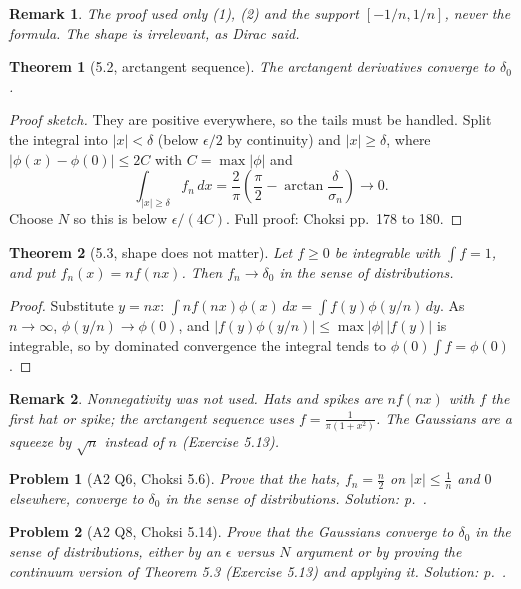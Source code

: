\documentclass{article}
\newtheorem{theorem}{Theorem}
\newtheorem{problem}{Problem}
\newtheorem{remark}{Remark}
\begin{document}
\begin{remark}
    The proof used only (1), (2) and the support $[-1/n,1/n]$, never the formula. The shape is irrelevant, as Dirac said.
\end{remark}
\begin{theorem}[5.2, arctangent sequence]
    The arctangent derivatives converge to $\delta_0$.
\end{theorem}
\begin{proof}[Proof sketch]
    They are positive everywhere, so the tails must be handled. Split the integral into $|x| < \delta$ (below $\epsilon/2$ by continuity) and $|x| \geq \delta$, where $|\phi(x) - \phi(0)| \leq 2C$ with $C = \max|\phi|$ and
    \begin{equation}
        \int_{|x|\geq\delta} f_n\,dx = \frac{2}{\pi}\left(\frac{\pi}{2} - \arctan\frac{\delta}{\sigma_n}\right) \to 0.
    \end{equation}
    Choose $N$ so this is below $\epsilon/(4C)$. Full proof: Choksi pp.~178 to 180.
\end{proof}
\begin{theorem}[5.3, shape does not matter]
    Let $f \geq 0$ be integrable with $\int f = 1$, and put $f_n(x) = n f(nx)$. Then $f_n \to \delta_0$ in the sense of distributions.
\end{theorem}
\begin{proof}
    Substitute $y = nx$: $\int n f(nx)\phi(x)\,dx = \int f(y)\phi(y/n)\,dy$. As $n \to \infty$, $\phi(y/n) \to \phi(0)$, and $|f(y)\phi(y/n)| \leq \max|\phi|\,|f(y)|$ is integrable, so by dominated convergence the integral tends to $\phi(0)\int f = \phi(0)$.
\end{proof}
\begin{remark}
    Nonnegativity was not used. Hats and spikes are $nf(nx)$ with $f$ the first hat or spike; the arctangent sequence uses $f = \frac{1}{\pi(1+x^2)}$. The Gaussians are a squeeze by $\sqrt{n}$ instead of $n$ (Exercise 5.13).
\end{remark}

\begin{problem}[A2 Q6, Choksi 5.6]\label{prob:a2-56}
    Prove that the hats, $f_n = \frac n2$ on $|x| \leq \frac1n$ and $0$ elsewhere, converge to $\delta_0$ in the sense of distributions.
    \hfill \emph{Solution: p.~\pageref{sol:a2-56}.}
\end{problem}
\begin{problem}[A2 Q8, Choksi 5.14]\label{prob:a2-514}
    Prove that the Gaussians converge to $\delta_0$ in the sense of distributions, either by an $\epsilon$ versus $N$ argument or by proving the continuum version of Theorem 5.3 (Exercise 5.13) and applying it.
    \hfill \emph{Solution: p.~\pageref{sol:a2-514}.}
\end{problem}
\end{document}
